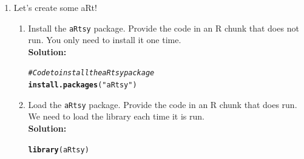 \documentclass{article}\usepackage[]{graphicx}\usepackage[]{xcolor}
\makeatletter
\newcommand{\hlsng}[1]{\textcolor[rgb]{0.192,0.494,0.8}{#1}}%
\newcommand{\hlcom}[1]{\textcolor[rgb]{0.678,0.584,0.686}{\textit{#1}}}%
\newcommand{\hldef}[1]{\textcolor[rgb]{0.345,0.345,0.345}{#1}}%
\newcommand{\hlkwd}[1]{\textcolor[rgb]{0.737,0.353,0.396}{\textbf{#1}}}%
\newenvironment{kframe}{%
 \def\at@end@of@kframe{}%
 \ifinner\ifhmode%
  \def\at@end@of@kframe{\end{minipage}}%
  \begin{minipage}{\columnwidth}%
 \fi\fi%
 \def\FrameCommand##1{\hskip\@totalleftmargin \hskip-\fboxsep
 \colorbox{shadecolor}{##1}\hskip-\fboxsep
     \hskip-\linewidth \hskip-\@totalleftmargin \hskip\columnwidth}%
 \MakeFramed {\advance\hsize-\width
   \@totalleftmargin\z@ \linewidth\hsize
   \@setminipage}}%
 {\par\unskip\endMakeFramed%
 \at@end@of@kframe}
\newenvironment{knitrout}{}{} %
\makeatother
\begin{document}
\begin{enumerate}
\item Let's create some aRt! 
\begin{enumerate}
  \item Install the \texttt{aRtsy} package. Provide the code in an R chunk   that does 
  not run. You only need to install it one time.\\
\textbf{Solution:}
\begin{knitrout}\scriptsize
{}\color{fgcolor}\begin{kframe}
\begin{alltt}
\hlcom{# Code to install the aRtsy package}
\hlkwd{install.packages}\hldef{(}\hlsng{"aRtsy"}\hldef{)}
\end{alltt}
\end{kframe}
\end{knitrout}
  \item Load the \texttt{aRtsy} package. Provide the code in an R chunk that does run. 
  We need to load the library each time it is run.\\
\textbf{Solution:}
\begin{knitrout}\scriptsize
{}\color{fgcolor}\begin{kframe}
\begin{alltt}
\hlkwd{library}\hldef{(aRtsy)}
\end{alltt}
\end{kframe}
\end{knitrout}

\end{enumerate}
\end{enumerate}
\end{document}
